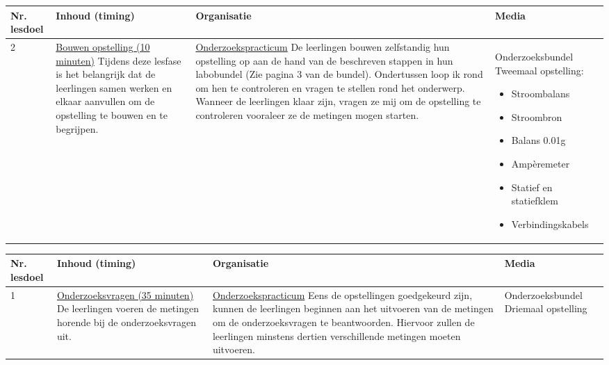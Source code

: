 \begin{landscape}
\begin{tabularx}{1.56\textwidth}{|p{1.5cm}|p{7cm}|X|p{5cm}|}
	\hline
	\textbf{Nr. lesdoel } & \textbf{Inhoud (timing)}  & \textbf{Organisatie } & \textbf{Media } \\ \hline
	2&\underline{Bouwen opstelling (10 minuten)}\newline
 		Tijdens deze lesfase is het belangrijk dat de leerlingen samen werken en elkaar aanvullen om de opstelling te bouwen en te begrijpen. 
	&  \underline{Onderzoekspracticum}\newline 
	De leerlingen bouwen zelfstandig hun opstelling op aan de hand van de beschreven stappen in hun labobundel (Zie pagina 3 van de bundel). Ondertussen loop ik rond om hen te controleren en vragen te stellen rond het onderwerp. Wanneer de leerlingen klaar zijn, vragen ze mij om de opstelling te controleren vooraleer ze de metingen mogen starten.
	& Onderzoeksbundel \newline\newline Tweemaal opstelling:
	\begin{itemize}
		\item Stroombalans
		\item Stroombron
		\item Balans 0.01g
		\item Ampèremeter
		\item Statief en statiefklem
		\item Verbindingskabels
	\end{itemize}
	\\ \hline
\end{tabularx}



\begin{tabularx}{1.56\textwidth}{|p{1.5cm}|p{7cm}|X|p{5cm}|}
	\hline
	\textbf{Nr. lesdoel } & \textbf{Inhoud (timing)}  & \textbf{Organisatie } & \textbf{Media } \\ \hline
	1\newline\newline 3\newline\newline 4\newline\newline 5\newline\newline 6&\underline{Onderzoeksvragen (35 minuten)}\newline
		De leerlingen voeren de metingen horende bij de onderzoeksvragen uit.
	&  \underline{Onderzoekspracticum}\newline 
	Eens de opstellingen goedgekeurd zijn, kunnen de leerlingen beginnen aan het uitvoeren van de metingen om de onderzoeksvragen te beantwoorden. Hiervoor zullen de leerlingen minstens dertien verschillende metingen moeten uitvoeren.
	& Onderzoeksbundel \newline\newline Driemaal opstelling
	\\ \hline
\end{tabularx}


\end{landscape}

